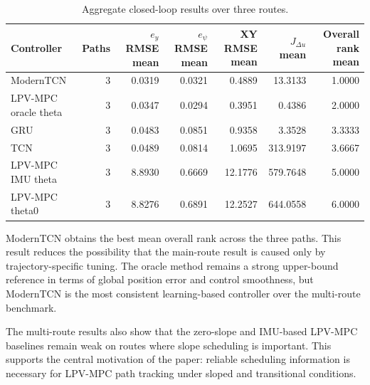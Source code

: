 \documentclass{ieeeaccess}
\begin{document}
\begin{table}[t]

\centering

\caption{Aggregate closed-loop results over three routes.}

\label{tab:multipath_aggregate}

\begin{tabular}{lrrrrrr}

\hline

Controller & Paths & $e_y$ RMSE mean & $e_{\psi}$ RMSE mean & XY RMSE mean & $J_{\Delta u}$ mean & Overall rank mean \\

\hline

ModernTCN & 3 & 0.0319 & 0.0321 & 0.4889 & 13.3133 & 1.0000 \\

LPV-MPC oracle theta & 3 & 0.0347 & 0.0294 & 0.3951 & 0.4386 & 2.0000 \\

GRU & 3 & 0.0483 & 0.0851 & 0.9358 & 3.3528 & 3.3333 \\

TCN & 3 & 0.0489 & 0.0814 & 1.0695 & 313.9197 & 3.6667 \\

LPV-MPC IMU theta & 3 & 8.8930 & 0.6669 & 12.1776 & 579.7648 & 5.0000 \\

LPV-MPC theta0 & 3 & 8.8276 & 0.6891 & 12.2527 & 644.0558 & 6.0000 \\

\hline

\end{tabular}

\end{table}

ModernTCN obtains the best mean overall rank across the three paths. This result reduces the possibility that the main-route result is caused only by trajectory-specific tuning. The oracle method remains a strong upper-bound reference in terms of global position error and control smoothness, but ModernTCN is the most consistent learning-based controller over the multi-route benchmark.



The multi-route results also show that the zero-slope and IMU-based LPV-MPC baselines remain weak on routes where slope scheduling is important. This supports the central motivation of the paper: reliable scheduling information is necessary for LPV-MPC path tracking under sloped and transitional conditions.
\end{document}
